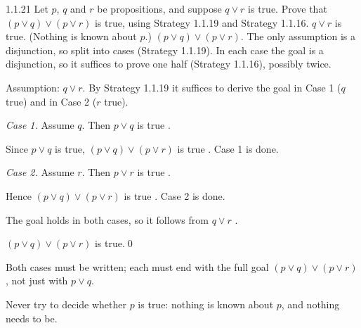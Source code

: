 \begin{bookex}[essential]{1.1.21}
Let $p$, $q$ and $r$ be propositions, and suppose $q\vee r$ is true. Prove that $(p\vee q)\vee(p\vee r)$ is true, using Strategy 1.1.19 and Strategy 1.1.16.
\solution
\given $q\vee r$ is true. (Nothing is known about $p$.)
\goal $(p\vee q)\vee(p\vee r)$. 
\plan The only assumption is a disjunction, so split into cases (Strategy 1.1.19). In each case the goal is a disjunction, so it suffices to prove one half (Strategy 1.1.16), possibly twice.
\begin{steps}
\item Assumption: $q\vee r$. By Strategy 1.1.19 it suffices to derive the goal in Case 1 ($q$ true) and in Case 2 ($r$ true).
\item \emph{Case 1.} Assume $q$. Then $p\vee q$ is true .
\item Since $p\vee q$ is true, $(p\vee q)\vee(p\vee r)$ is true . Case 1 is done.
\item \emph{Case 2.} Assume $r$. Then $p\vee r$ is true .
\item Hence $(p\vee q)\vee(p\vee r)$ is true . Case 2 is done.
\item The goal holds in both cases, so it follows from $q\vee r$ .
\end{steps}
\conclusion $(p\vee q)\vee(p\vee r)$ is true.\qed
\begin{compare}
\item Both cases must be written; each must end with the full goal $(p\vee q)\vee(p\vee r)$, not just with $p\vee q$.
\item Never try to decide whether $p$ is true: nothing is known about $p$, and nothing needs to be.
\end{compare}
\end{bookex}

